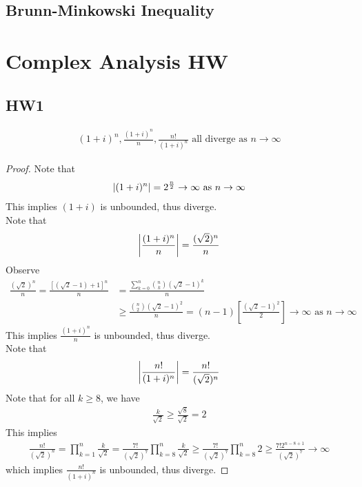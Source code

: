 \documentclass{report}
\begin{document}
\section{Brunn-Minkowski Inequality}
\chapter{Complex Analysis HW}
\section{HW1}
\begin{theorem}
\begin{align*}
  (1+i)^n, \frac{(1+i)^n}{n},\frac{n!}{(1+i)^n}\text{ all diverge as }n\to \infty
\end{align*}
\begin{proof}
Note that 
\begin{align*}
\left|(1+i)^n\right|=2^{\frac{n}{2}}\to \infty\text{ as }n\to \infty
\end{align*}
This implies $(1+i)$ is unbounded, thus diverge.\\

Note that 
\begin{align*}
\left|\frac{(1+i)^n}{n}\right|=\frac{(\sqrt{2})^n}{n}
\end{align*}
Observe 
\begin{align*}
\frac{(\sqrt{2})^n}{n}= \frac{[(\sqrt{2}-1)+1]^n}{n}&=\frac{\sum_{k=0}^n \binom{n}{k}(\sqrt{2}-1)^k}{n}\\
&\geq \frac{\binom{n}{2}(\sqrt{2}-1 )^2}{n}=(n-1) [\frac{(\sqrt{2}-1 )^2}{2}]\to \infty\text{ as }n\to \infty
\end{align*}
This implies $\frac{(1+i)^n}{n}$ is unbounded, thus diverge. \\

Note that 
\begin{align*}
\left|\frac{n!}{(1+i)^n}\right|= \frac{n!}{(\sqrt{2})^n}
\end{align*}
Note that for all $k\geq 8$, we have 
\begin{align*}
\frac{k}{\sqrt{2}}\geq \frac{\sqrt{8}}{\sqrt{2}}=2
\end{align*}
This implies 
\begin{align*}
  \frac{n!}{(\sqrt{2})^n}=\prod_{k=1}^n \frac{k}{\sqrt{2}}= \frac{7!}{(\sqrt{2})^7}\prod_{k=8}^n \frac{k}{\sqrt{2}}\geq \frac{7!}{(\sqrt{2})^7}\prod_{k=8}^n 2\geq \frac{7!2^{n-8+1}}{(\sqrt{2})^7}\to \infty
\end{align*}
which implies $\frac{n!}{(1+i)^n}$ is unbounded, thus diverge.
\end{proof}
\end{theorem}
\end{document}
